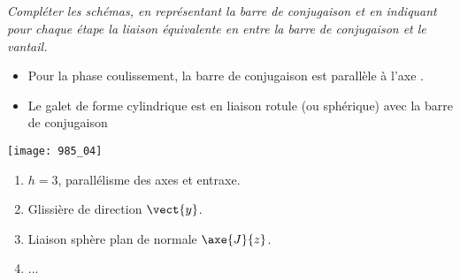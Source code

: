 \subparagraph{}
\textit{Compléter les schémas, en représentant la barre de conjugaison et en indiquant pour
chaque étape la liaison équivalente en entre la barre de conjugaison et le vantail.}
\ifprof
\begin{corrige}
\end{corrige}
\else
\fi

\begin{rem}
\begin{itemize}
\item Pour la phase coulissement, la barre de conjugaison est parallèle à l’axe .
\item Le galet de forme cylindrique est en liaison rotule (ou sphérique) avec la barre de conjugaison
\end{itemize}
\end{rem}


\begin{center}
\texttt{[image: 985\_04]}%
\end{center}



\begin{enumerate}
\item $h=3$, parallélisme des axes et entraxe.
\item Glissière de direction $\vect{y}$.
\item Liaison sphère plan de normale $\axe{J}{z}$.
\item ...
\end{enumerate}
